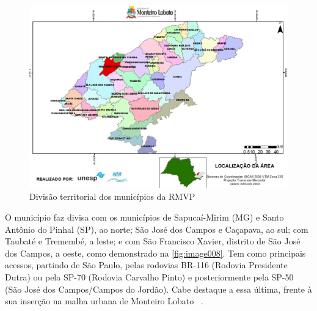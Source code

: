 \begin{figure}[hbt!]
	\centering
	\includegraphics[width=1\linewidth]{produtos/proddois/image007}
	\caption{Divisão territorial dos municípios da RMVP}
	\label{fig:image007}
\end{figure}

O município faz divisa com os municípios de Sapucaí-Mirim (MG) e Santo Antônio do Pinhal (SP), ao norte; São José dos Campos e Caçapava, ao sul; com Taubaté e Tremembé, a leste; e com São Francisco Xavier, distrito de São José dos Campos, a oeste, como demonstrado na \autoref{fig:image008}. Tem como principais acessos, partindo de São Paulo, pelas rodovias BR-116 (Rodovia Presidente Dutra) ou pela SP-70 (Rodovia Carvalho Pinto) e posteriormente pela SP-50 (São José dos Campos/Campos do Jordão). Cabe destaque a essa última, frente à sua inserção na malha urbana de Monteiro Lobato ~\cite{MonteiroLobatoSite}.

